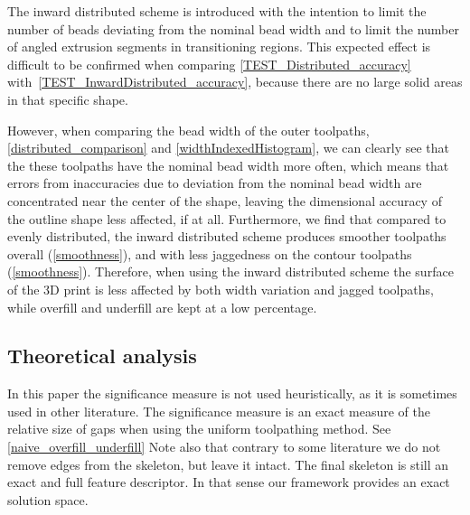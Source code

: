 The inward distributed scheme is introduced with the intention to limit the number of beads deviating from the nominal bead width and to limit the number of angled extrusion segments in transitioning regions.
This expected effect is difficult to be confirmed when comparing \cref{TEST_Distributed_accuracy} with~\ref{TEST_InwardDistributed_accuracy}, because there are no large solid areas in that specific shape.

However, when comparing the bead width of the outer toolpaths, \cref{distributed_comparison} and  \cref{widthIndexedHistogram}, we can clearly see that the these toolpaths have the nominal bead width more often, which means that errors from inaccuracies due to deviation from the nominal bead width are concentrated near the center of the shape, leaving the dimensional accuracy of the outline shape less affected, if at all. 
Furthermore, we find that compared to evenly distributed, the inward distributed scheme produces smoother toolpaths overall (\cref{smoothness}), and with less jaggedness on the contour toolpaths (\cref{smoothness}). 
Therefore, when using the inward distributed scheme the surface of the 3D print is less affected by both width variation and jagged toolpaths, while overfill and underfill are kept at a low percentage.


\subsection{Theoretical analysis}

In this paper the significance measure is not used heuristically, as it is sometimes used in other literature.
The significance measure is an exact measure of the relative size of gaps when using the uniform toolpathing method.
See \cref{naive_overfill_underfill}
Note also that contrary to some literature we do not remove edges from the skeleton, but leave it intact.
The final skeleton is still an exact and full feature descriptor.
In that sense our framework provides an exact solution space.

